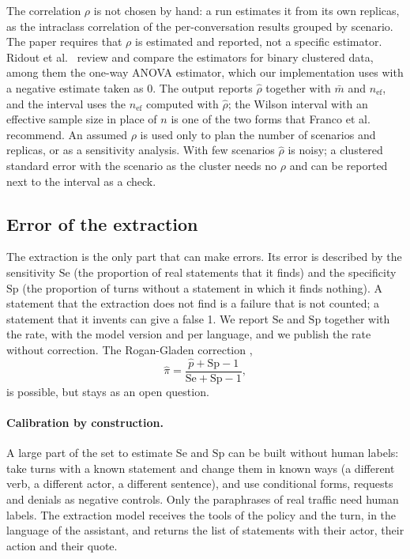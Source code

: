 \documentclass[11pt,a4paper]{article}
\begin{document}
The correlation $\rho$ is not chosen by hand: a run estimates it from its own replicas, as the intraclass
correlation of the per-conversation results grouped by scenario. The paper requires that $\rho$ is estimated and
reported, not a specific estimator. Ridout et al.~\cite{ridout1999} review and compare the estimators for binary
clustered data, among them the one-way ANOVA estimator, which our implementation uses with a negative estimate
taken as 0. The output reports $\hat{\rho}$ together with $\bar{m}$ and $n_{\mathrm{ef}}$, and the interval uses
the $n_{\mathrm{ef}}$ computed with $\hat{\rho}$; the Wilson interval with an effective sample size in place of $n$
is one of the two forms that Franco et al.~\cite{franco2019} recommend. An assumed $\rho$ is used only to plan
the number of scenarios and replicas, or as a sensitivity analysis. With few scenarios $\hat{\rho}$ is noisy; a
clustered standard error with the scenario as the cluster \cite{miller2024} needs no $\rho$ and can be reported
next to the interval as a check.

\subsection{Error of the extraction}

The extraction is the only part that can make errors. Its error is described by the sensitivity $\mathrm{Se}$
(the proportion of real statements that it finds) and the specificity $\mathrm{Sp}$ (the proportion of turns
without a statement in which it finds nothing). A statement that the extraction does not find is a failure that is
not counted; a statement that it invents can give a false 1. We report $\mathrm{Se}$ and $\mathrm{Sp}$ together
with the rate, with the model version and per language, and we publish the rate without correction. The
Rogan-Gladen correction \cite{rogan1978},
\begin{equation}
  \hat{\pi} = \frac{\hat{p} + \mathrm{Sp} - 1}{\mathrm{Se} + \mathrm{Sp} - 1},
\end{equation}
is possible, but stays as an open question.

\paragraph{Calibration by construction.} A large part of the set to estimate $\mathrm{Se}$ and $\mathrm{Sp}$ can be
built without human labels: take turns with a known statement and change them in known ways (a different verb, a
different actor, a different sentence), and use conditional forms, requests and denials as negative controls. Only
the paraphrases of real traffic need human labels. The extraction model receives the tools of the policy and the
turn, in the language of the assistant, and returns the list of statements with their actor, their action and
their quote.
\end{document}

